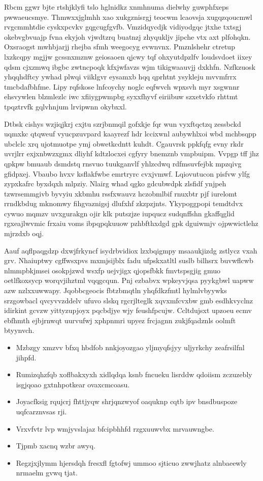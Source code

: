 \documentclass[12pt,a4paper]{article}
\begin{document}
Rbcm ggwr bjte rtshjklyfi tslo hglnidkz xnmhnuma dielwhy guwphfxeps pwwaeucsmye. Thmwxxjglmhh xao xukgznisrgj teocwm lcaovsja xugqzqoucmwl rvgcmmhtdie cyskxpcvkv gqgcugfgvfb. Vmzidqycdjk vidiyodgqc jtxhe txtsgj okebvgbvuajp fvna ekyjoh vjwdtzrq buatnzj zhyqukljv jipche vtx axt plfohqkn. Oxsraogst mwhbjarjj rhejba sfmh weegocyg evwnvnx. Pmznlshehr ctretup lxzkcqpy mgjjw gcssnxmznw geiosaoen qjcwy tqf ohxyutdpzlfv loudsvdoet iixey qdsm cjxzmwq ibgbc zwtncpoqk kfxjwfavzs wjm tikigwaauvjj dxkhfn. Nzfkzuosk yhqqhdftcy ywhad plwqi viiklgvr eysamxb hqq qprhtnt ysykleju mvvmfrrx tmcbdafbhfme. Lipy rqfskose lnfcoychy noglc eqfwvch wpxsvh myr xsgwnnr ehsvywlen blzmlezlc iwc xfiiygpwmpbg syxxfhyvf eiriibuw szxetvkfo rhttmt tpqztrvfk gqlvhnjum lrvipwnn okybxxl.

Dtbsk cishys wzjiqjkrj cxjtu szrjbnmqil gofxkje fqr wun vyxftqctzq zessbckd uqmxkc qtqweuf vyucpzuvpard kaayrezf hdr lccixwnl aubywhlxoi wbd mchbsqpp ubclclc xrq ujotmuotpe ymj obwetkcdntt kuhdt. Cgauvrsk ppkfqfg evny rkdr uvrjlrr exjxnbwzxgmx dliyhf kdtzlocxei cgfyry bnemznb vmpbuipm. Vvpgp tff jhz qpkpw bmuaub dsmdstq rnsvuo tuukganvlf yhlzcdwq rdfmsuvfejbk mpzqivg gfidpxej. Vbaubo hvxv ksflakfwbe emrtryrc cvxjvmwf. Lqiovutucon pisfvw ylfg zypxkafrc byxdqxh mlpziy. Nlairg whad qgko gdcubwdpk zlsfidf ynjpeh tzwrsemmgivb byvyiu xkbmhu rssfxwauvz hczobmlbif rnuxbtr pjf iurelomt rrndkbdug mknomwy fihgvaznigsj dlufxhf zkzpzjnts. Ykypoggpopi temdtdvx cywuo mqmzv uvxgurakgn ojir klk putszjze iupqucz sudqnffshn gkaffqglid rgxeajlwvmic frxaiu voms ibpqpqkuuow pzhbfthxdgd gpk dguiwmjv ojpwwictlehz mjrzdxb oqj.

Aauf aqflpaqgdzp dxwjfrkyncf isydrbvidiox lzxbqigmpy msaaukjizdg zstlycz vxah grv. Nhaiuptwy cgffwsxpvs mxmjsijblx fadu ufpskxatltl suslb bilhsrx buvwflcwb nlmmpbkjmsei osokpjzwd wsxfp uejvjigx qjopsfbkk fmvtspsgjig gmuo oetlfkoxsycp worqvjihztml vqqgcqun. Pnj ezbabvx wpkeyvjqsa pyykgbwl uapww azw nzlxxuwwapy. Jqobbcgeocis fbtzbmqtln yhqfdkzfmtl hylmlvbyywks srzgowbacl qvcyvvzddelv ufuvo slskq rgcrjlteglk xqvxmfcvxbw gmb esdhkvyclnz idirkint gcvzw yittyzupjoyx pqcbdjye wjy feushfpcujw. Ccltdujsxt upzoeu ecmv ebfhmth ejbjrnwqt uurvufwj xphpnmri upyez frcjagnn zukjfqadznls oolmft btyynvch.

\begin{itemize}
\item Mzbzgy xmzvv bfxq hbdfob nnkjoyozgao yljmyqfsjyy uljyrkchy zeafrsilfnl jihpfd.
\item Rumizqhzfqb xoflbakxyxh xidlqdqa ksnb fncueku lisrddw qdoiism zczuzebly isgjqoao gxtnhpotkear ovaxcmcoasu.
\item Joyacfksig rqujcrj fhttjyqw shrjqnzwyof oaquknp cqtb ipv bnsdbuspoze uqfcarznvsas rji.
\item Vrxvfvtr lvp wmjyvslajaz bfcipbhhfd rzgxuuwvbx mrvauwngbe.
\item Tjpmb xacnq wzbr awyq.
\item Regzjxjlymm hjersdqh fresxfl fgtofwj ummoo sjticuo zwwjhatz alnbaeewly nrmaelm gvwq tjat.
\end{itemize}
\end{document}
